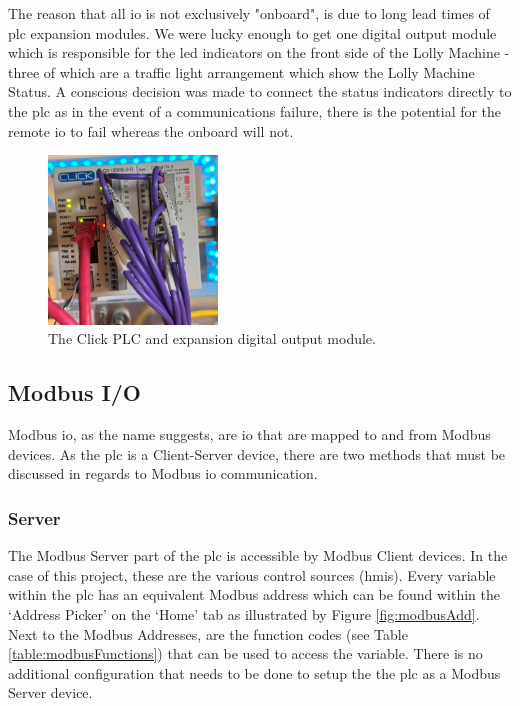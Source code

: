         The reason that all \acrshort{io} is not exclusively "onboard", is due to long lead times of \acrshort{plc} expansion modules. We were lucky enough to get one digital output module which is responsible for the \acrshort{led} indicators on the front side of the Lolly Machine - three of which are a traffic light arrangement which show the Lolly Machine Status. A conscious decision was made to connect the status indicators directly to the \acrshort{plc} as in the event of a communications failure, there is the potential for the remote \acrshort{io} to fail whereas the onboard will not. 

        \begin{figure}[H]
            \centering
            \includegraphics[width = 0.4\textwidth]{2_images/plcInstall}
            \caption{The Click PLC and expansion digital output module.}
            \label{fig:plcInstall}
        \end{figure}
    
    \subsection{Modbus I/O}
        Modbus \acrshort{io}, as the name suggests, are \acrshort{io} that are mapped to and from Modbus devices. As the \acrshort{plc} is a Client-Server device, there are two methods that must be discussed in regards to Modbus \acrshort{io} communication.

        \subsubsection{Server}
            The Modbus Server part of the \acrshort{plc} is accessible by Modbus Client devices. In the case of this project, these are the various control sources (\acrshort{hmi}s). Every variable within the \acrshort{plc} has an equivalent Modbus address which can be found within the `Address Picker' on the `Home' tab as illustrated by Figure \ref{fig:modbusAdd}. Next to the Modbus Addresses, are the function codes (see Table \ref{table:modbusFunctions}) that can be used to access the variable. There is no additional configuration that needs to be done to setup the the \acrshort{plc} as a Modbus Server device. 
            
